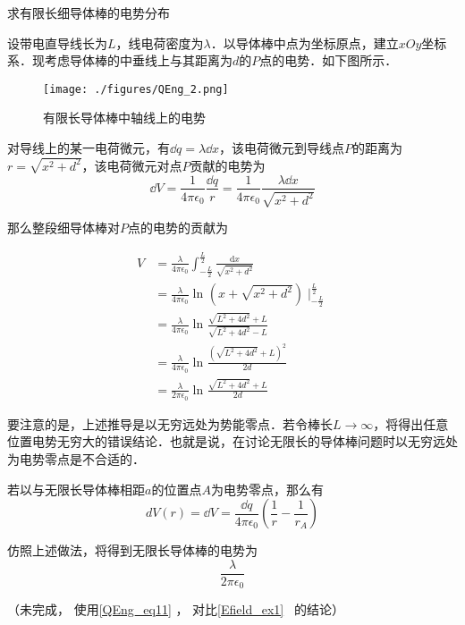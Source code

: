 \begin{example}{求有限长细导体棒的电势分布}

设带电直导线长为$L$，线电荷密度为$\lambda$．以导体棒中点为坐标原点，建立$xOy$坐标系．现考虑导体棒的中垂线上与其距离为$d$的$P$点的电势．如下图所示．

\begin{figure}[ht]
\centering
\texttt{[image: ./figures/QEng\_2.png]}
\caption{有限长导体棒中轴线上的电势} \label{QEng_fig2}
\end{figure}

对导线上的某一电荷微元，有$\dd q=\lambda \dd x$，该电荷微元到导线点$P$的距离为$r=\sqrt{x^2+d^2}$，该电荷微元对点$P$贡献的电势为
\begin{equation}
\dd V=\frac{1}{4\pi \epsilon_0}\frac{\dd q}{r}=\frac{1}{4\pi \epsilon_0}\frac{\lambda \dd x}{\sqrt{x^2+d^2}}
\end{equation}

那么整段细导体棒对$P$点的电势的贡献为

\begin{equation}
\begin{aligned}
V &=\frac{\lambda }{4 \pi \epsilon_{0}}\int_{-\frac{L}{2}}^{\frac{L}{2}}\frac{\mathrm{d} x}{\sqrt{x^{2}+d^{2}}}\\
&=\frac{\lambda }{4 \pi \epsilon_{0}}\ln_{}{(x+\sqrt{x^2+d^2})}\mid_{-\frac{L}{2}}^{\frac{L}{2}}\\
&=\frac{\lambda }{4 \pi \epsilon_{0}}\ln_{}{\frac{\sqrt{L^2+4d^2}+L}{\sqrt{L^2+4d^2}-L}}\\
&=\frac{\lambda }{4 \pi \epsilon_{0}}\ln_{}{\frac{(\sqrt{L^2+4d^2}+L)^2}{2d}}\\
&=\frac{\lambda }{2 \pi \epsilon_{0}}\ln_{}{\frac{\sqrt{L^2+4d^2}+L}{2d}}
\end{aligned}
\end{equation}


要注意的是，上述推导是以无穷远处为势能零点．若令棒长$L\rightarrow \infty$，将得出任意位置电势无穷大的错误结论．也就是说，在讨论无限长的导体棒问题时以无穷远处为电势零点是不合适的．

若以与无限长导体棒相距$a$的位置点$A$为电势零点，那么有
\begin{equation}
dV(r)=\dd V=\frac{\dd q}{4\pi \epsilon_0}(\frac{1}{r}-\frac{1}{r_A})
\end{equation}

仿照上述做法，将得到无限长导体棒的电势为
\begin{equation}
\frac{\lambda }{2 \pi \epsilon_{0}}
\end{equation}

（未完成， 使用\autoref{QEng_eq11} ， 对比\autoref{Efield_ex1}~ 的结论）

\end{example}

